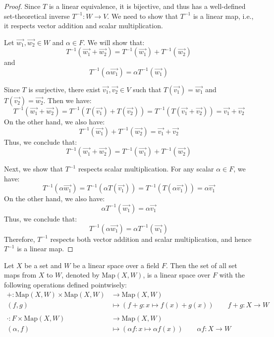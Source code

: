 \documentclass[
	11pt, %
	fleqn, %
	a4paper, %
]{LegrandOrangeBook}
\begin{document}
\begin{proof}
    Since \(T\) is a linear equivalence, it is bijective, and thus has a well-defined set-theoretical inverse \(T^{-1}: W \to V\). We need to show that \(T^{-1}\) is a linear map, i.e., it respects vector addition and scalar multiplication.

    Let \(\vec{w_1}, \vec{w_2} \in W\) and \(\alpha \in F\). We will show that:
    \[
        T^{-1}(\vec{w_1} + \vec{w_2}) = T^{-1}(\vec{w_1}) + T^{-1}(\vec{w_2})
    \]
    and
    \[
        T^{-1}(\alpha \vec{w_1}) = \alpha T^{-1}(\vec{w_1})
    \]

    Since \(T\) is surjective, there exist \(\vec{v_1}, \vec{v_2} \in V\) such that \(T(\vec{v_1}) = \vec{w_1}\) and \(T(\vec{v_2}) = \vec{w_2}\). Then we have:
    \[
        T^{-1}(\vec{w_1} + \vec{w_2}) = T^{-1}(T(\vec{v_1}) + T(\vec{v_2})) = T^{-1}(T(\vec{v_1} + \vec{v_2})) = \vec{v_1} + \vec{v_2}
    \]
    On the other hand, we also have:
    \[
        T^{-1}(\vec{w_1}) + T^{-1}(\vec{w_2}) = \vec{v_1} + \vec{v_2}
    \]
    Thus, we conclude that:
    \[
        T^{-1}(\vec{w_1} + \vec{w_2}) = T^{-1}(\vec{w_1}) + T^{-1}(\vec{w_2})
    \]

    Next, we show that \(T^{-1}\) respects scalar multiplication. For any scalar \(\alpha \in F\), we have:
    \[
        T^{-1}(\alpha \vec{w_1}) = T^{-1}(\alpha T(\vec{v_1})) = T^{-1}(T(\alpha \vec{v_1})) = \alpha \vec{v_1}
    \]
    On the other hand, we also have:
    \[
        \alpha T^{-1}(\vec{w_1}) = \alpha \vec{v_1}
    \]
    Thus, we conclude that:
    \[
        T^{-1}(\alpha \vec{w_1}) = \alpha T^{-1}(\vec{w_1})
    \]
    Therefore, \(T^{-1}\) respects both vector addition and scalar multiplication, and hence \(T^{-1}\) is a linear map.
\end{proof}

\begin{proposition}
    Let $X$ be a set and $W$ be a linear space over a field $F$. Then the set of all set maps from $X$ to $W$, denoted by $\text{Map}(X, W)$, is a linear space over $F$ with the following operations defined pointwisely:
    \[
        \begin{split}
            + : \text{Map}(X, W) \times \text{Map}(X, W) &\to \text{Map}(X, W) \\
            (f,g) &\mapsto (f+g: x \mapsto f(x) + g(x)) \qquad f + g : X \to W \\ \\
            \cdot : F \times \text{Map}(X, W) &\to \text{Map}(X, W) \\
            (\alpha,f) &\mapsto (\alpha f: x \mapsto \alpha f(x)) \qquad \alpha f : X \to W
        \end{split}
    \]
\end{proposition}
\end{document}
